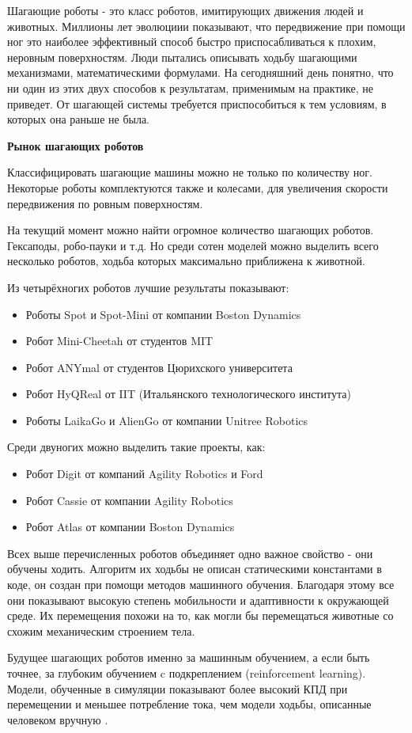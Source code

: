 
Шагающие роботы - это класс роботов, имитирующих движения людей и животных. Миллионы лет эволюциии показывают, что передвижение при помощи ног это наиболее эффективный способ быстро приспосабливаться к плохим, неровным поверхностям. Люди пытались описывать ходьбу шагающими механизмами, математическими формулами. На сегодняшний день понятно, что ни один из этих двух способов к результатам, применимым на практике, не приведет. От шагающей системы требуется приспособиться к тем условиям, в которых она раньше не была.

\textbf{Рынок шагающих роботов}

Классифицировать шагающие машины можно не только по количеству ног. Некоторые роботы комплектуются также и колесами, для увеличения скорости передвижения по ровным поверхностям. 

На текущий момент можно найти огромное количество шагающих роботов. Гексаподы, робо-пауки и т.д. Но среди сотен моделей можно выделить всего несколько роботов, ходьба которых максимально приближена к животной.

Из четырёхногих роботов лучшие результаты показывают:
\begin{itemize}
    \item Роботы Spot и Spot-Mini от компании Boston Dynamics
    \item Робот Mini-Cheetah от студентов MIT
    \item Робот ANYmal от студентов Цюрихского университета
    \item Робот HyQReal от IIT (Итальянского технологического института)
    \item Роботы LaikaGo и AlienGo от компании Unitree Robotics
\end{itemize}

Среди двуногих можно выделить такие проекты, как:

\begin{itemize}
    \item Робот Digit от компаний Agility Robotics и Ford
    \item Робот Cassie от компании Agility Robotics
    \item Робот Atlas от компании Boston Dynamics
\end{itemize}

Всех выше перечисленных роботов объединяет одно важное свойство - они обучены ходить. Алгоритм их ходьбы не описан статическими константами в коде, он создан при помощи методов машинного обучения. Благодаря этому все они показывают высокую степень мобильности и адаптивности к окружающей среде. Их перемещения похожи на то, как могли бы перемещаться животные со схожим механическим строением тела.

Будущее шагающих роботов именно за машинным обучением, а если быть точнее, за глубоким обучением c подкреплением (reinforcement learning). Модели, обученные в симуляции показывают более высокий КПД при перемещении и меньшее потребление тока, чем модели ходьбы, описанные человеком вручную \cite{Hwangbo2019}. 
